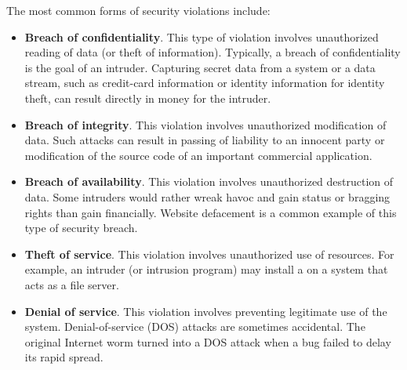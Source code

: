 The most common forms of security violations include:
\begin{itemize}[noitemsep]
\item \textbf{Breach of confidentiality}.
  This type of violation involves unauthorized reading of data (or theft of information).
  Typically, a breach of confidentiality is the goal of an intruder.
  Capturing secret data from a system or a data stream, such as credit-card information or identity information for identity theft, can result directly in money for the intruder.
\item \textbf{Breach of integrity}.
  This violation involves unauthorized modification of data.
  Such attacks can result in passing of liability to an innocent party or modification of the source code of an important commercial application.
\item \textbf{Breach of availability}.
  This violation involves unauthorized destruction of data.
  Some intruders would rather wreak havoc and gain status or bragging rights than gain financially.
  Website defacement is a common example of this type of security breach.
\item \textbf{Theft of service}.
  This violation involves unauthorized use of resources.
  For example, an intruder (or intrusion program) may install a  on a system that acts as a file server.
\item \textbf{Denial of service}.
  This violation involves preventing legitimate use of the system.
  Denial-of-service (DOS) attacks are sometimes accidental.
  The original Internet worm turned into a DOS attack when a bug failed to delay its rapid spread.
\end{itemize}


